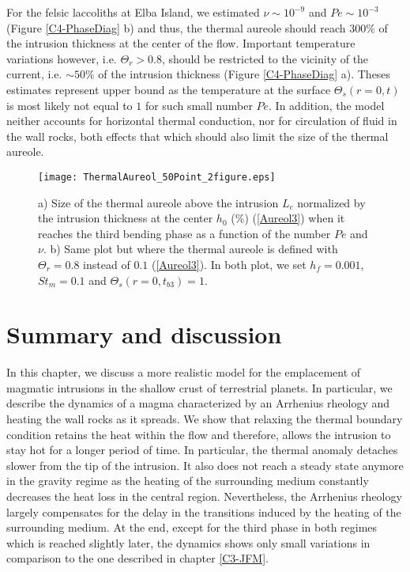 For   the   felsic   laccoliths   at   Elba   Island,   we   estimated
$\nu \sim 10^{-9}$ and  $Pe\sim 10^{-3}$ (Figure \ref{C4-PhaseDiag} b)
and thus,  the thermal aureole  should reach $300\%$ of  the intrusion
thickness at the center of  the flow. Important temperature variations
however, i.e. $\Theta_r>0.8$, should be  restricted to the vicinity of
the  current, i.e.   $\sim 50\%$  of the  intrusion thickness  (Figure
\ref{C4-PhaseDiag} a).  Theses estimates  represent upper bound as the
temperature at the surface $\Theta_s(r=0,t)$  is most likely not equal
to $1$  for such small  number $Pe$.   In addition, the  model neither
accounts  for horizontal  thermal conduction,  nor for  circulation of
fluid in the wall rocks, both effects that which should also limit the
size of the thermal aureole.

\begin{figure}[h!]
  \begin{center}
    \graphicspath{ {/Users/thorey/Documents/These/Projet/Refroidissement/Skin_Model/Figure/Figure_Heating/} }
    \texttt{[image: ThermalAureol\_50Point\_2figure.eps]}
    \caption{a) Size of the thermal  aureole above the intrusion $L_c$
      normalized by the intrusion thickness at the center $h_0$ ($\%$)
      (\ref{Aureol3}) when  it reaches  the third  bending phase  as a
      function of the  number $Pe$ and $\nu$.  b) Same  plot but where
      the thermal  aureole is  defined with $\Theta_r=0.8$  instead of
      $0.1$  (\ref{Aureol3}).   In  both  plot,  we  set  $h_f=0.001$,
      $St_m=0.1$ and $\Theta_s(r=0,t_{b3})=1$.}
    \label{PhaseHeating}
  \end{center}
\end{figure}


\section{Summary and discussion}
\label{sec:discussion}

In this chapter, we discuss a more realistic model for the emplacement
of magmatic intrusions in the shallow crust of terrestrial planets. In
particular, we  describe the dynamics  of a magma characterized  by an
Arrhenius rheology and heating the wall  rocks as it spreads.  We show
that relaxing the  thermal boundary condition retains  the heat within
the flow and therefore, allows the  intrusion to stay hot for a longer
period of  time.  In particular,  the thermal anomaly  detaches slower
from the tip of the intrusion.  It  also does not reach a steady state
anymore in the gravity regime as the heating of the surrounding medium
constantly   decreases  the   heat   loss  in   the  central   region.
Nevertheless, the Arrhenius rheology largely compensates for the delay
in the transitions  induced by the heating of  the surrounding medium.
At  the end,  except for  the  third phase  in both  regimes which  is
reached slightly  later, the dynamics  shows only small  variations in
comparison to the one described in chapter \ref{C3-JFM}.

